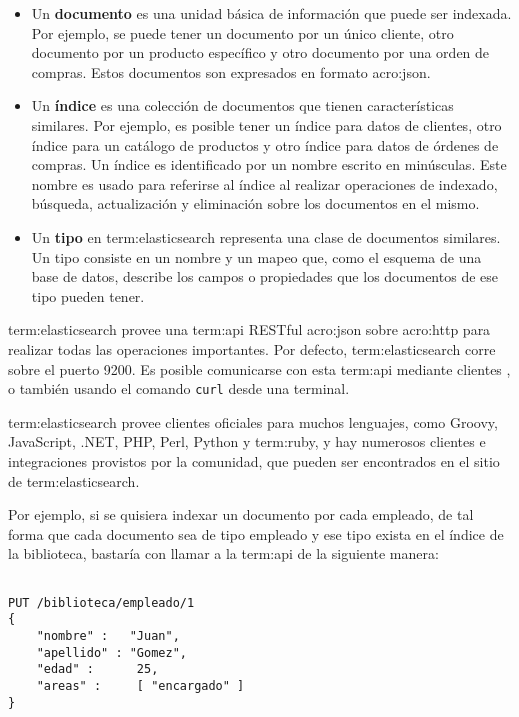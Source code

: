 \begin{itemize}

\item
Un \textbf{documento} es una unidad básica de información que puede ser
indexada. Por ejemplo, se puede tener un documento por un único cliente, otro
documento por un producto específico y otro documento por una orden de compras.
Estos documentos son expresados en formato \gls{acro:json}.

\item
Un \textbf{índice} es una colección de documentos que tienen características
similares. Por ejemplo, es posible tener un índice para datos de clientes, otro
índice para un catálogo de productos y otro índice para datos de órdenes de
compras. Un índice es identificado por un nombre escrito en minúsculas. Este
nombre es usado para referirse al índice al realizar operaciones de indexado,
búsqueda, actualización y eliminación sobre los documentos en el mismo.

\item
Un \textbf{tipo} en \gls{term:elasticsearch} representa una clase de documentos
similares. Un tipo consiste en un nombre y un mapeo que, como el esquema de una
base de datos, describe los campos o propiedades que los documentos de ese tipo
pueden tener.

\end{itemize}

\gls{term:elasticsearch} provee una \gls{term:api} RESTful \gls{acro:json} sobre
\gls{acro:http} para realizar todas las operaciones importantes. Por defecto,
\gls{term:elasticsearch} corre sobre el puerto 9200. Es posible comunicarse con
esta \gls{term:api} mediante clientes , o también usando el comando
\texttt{curl} desde una terminal.

\gls{term:elasticsearch} provee clientes oficiales para muchos lenguajes, como
Groovy, JavaScript, .NET, PHP, Perl, Python y \gls{term:ruby}, y hay numerosos
clientes e integraciones provistos por la comunidad, que pueden ser encontrados
en el sitio  de \gls{term:elasticsearch}.

Por ejemplo, si se quisiera indexar un documento por cada empleado, de tal forma
que cada documento sea de tipo empleado y ese tipo exista en el índice de la
biblioteca, bastaría con llamar a la \gls{term:api} de la siguiente manera:

\begin{lstlisting}

PUT /biblioteca/empleado/1
{
    "nombre" :   "Juan",
    "apellido" : "Gomez",
    "edad" :      25,
    "areas" :     [ "encargado" ]
}

\end{lstlisting}


